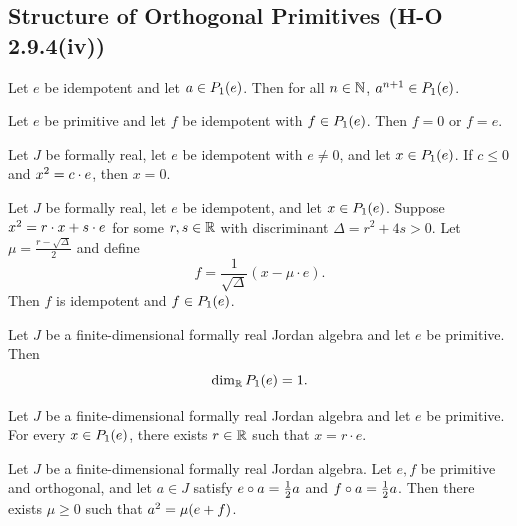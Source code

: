 \subsection{Structure of Orthogonal Primitives (H-O 2.9.4(iv))}

\begin{theorem}
Let $e$ be idempotent and let $a \in \Peirce{e}{1}$. Then for all $n \in \N$, $\jpow{a}{n+1} \in \Peirce{e}{1}$.
\end{theorem}

\begin{theorem}
Let $e$ be primitive and let $f$ be idempotent with $f \in \Peirce{e}{1}$. Then $f = 0$ or $f = e$.
\end{theorem}

\begin{theorem}
Let $J$ be formally real, let $e$ be idempotent with $e \ne 0$, and let $x \in \Peirce{e}{1}$. If $c \le 0$ and $\jsq{x} = c \cdot e$, then $x = 0$.
\end{theorem}

\begin{theorem}
Let $J$ be formally real, let $e$ be idempotent, and let $x \in \Peirce{e}{1}$. Suppose $\jsq{x} = r \cdot x + s \cdot e$ for some $r, s \in \R$ with discriminant $\Delta = r^2 + 4s > 0$. Let $\mu = \frac{r - \sqrt{\Delta}}{2}$ and define
\[ f = \frac{1}{\sqrt{\Delta}} (x - \mu \cdot e). \]
Then $f$ is idempotent and $f \in \Peirce{e}{1}$.
\end{theorem}

\begin{theorem}
Let $J$ be a finite-dimensional formally real Jordan algebra and let $e$ be primitive. Then
\[ \dim_\R \Peirce{e}{1} = 1. \]
\end{theorem}

\begin{theorem}
Let $J$ be a finite-dimensional formally real Jordan algebra and let $e$ be primitive. For every $x \in \Peirce{e}{1}$, there exists $r \in \R$ such that $x = r \cdot e$.
\end{theorem}

\begin{theorem}
Let $J$ be a finite-dimensional formally real Jordan algebra. Let $e, f$ be primitive and orthogonal, and let $a \in J$ satisfy $e \jmul a = \frac{1}{2} a$ and $f \jmul a = \frac{1}{2} a$. Then there exists $\mu \ge 0$ such that $\jsq{a} = \mu (e + f)$.
\end{theorem}

